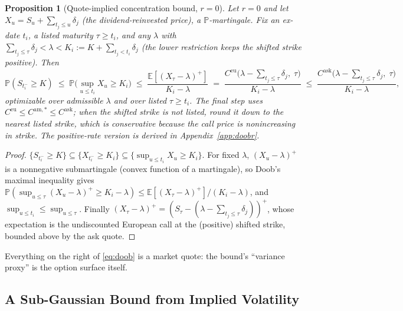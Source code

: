 \documentclass[11pt]{article}
\newtheorem{proposition}{Proposition}
\theoremstyle{remark}
\newcommand{\Ceu}{C^{\mathrm{eu}}}
\newcommand{\E}{\mathbb{E}}
\newcommand{\Prob}{\mathbb{P}}
\begin{document}
\begin{proposition}[Quote-implied concentration bound, $r=0$]\label{prop:doob}
Let $r=0$ and let $X_u=S_u+\sum_{t_j\le u}\delta_j$ (the dividend-reinvested price), a $\Prob$-martingale. Fix an ex-date $t_i$, a listed maturity $\tau\ge t_i$, and any $\lambda$ with $\sum_{t_j\le\tau}\delta_j<\lambda<K_i:=K+\sum_{t_j<t_i}\delta_j$ (the lower restriction keeps the shifted strike positive). Then
\begin{equation}
\Prob\!\left(S_{t_i^-}\ge K\right)\;\le\;\Prob\!\Big(\sup_{u\le t_i}X_u\ge K_i\Big)\;\le\;\frac{\E[(X_\tau-\lambda)^+]}{K_i-\lambda}\;=\;\frac{C^{\mathrm{eu}}\!\big(\lambda-{\textstyle\sum_{t_j\le\tau}}\delta_j,\;\tau\big)}{K_i-\lambda}\;\le\;\frac{C^{\mathrm{ask}}\!\big(\lambda-{\textstyle\sum_{t_j\le\tau}}\delta_j,\;\tau\big)}{K_i-\lambda},
\label{eq:doob}
\end{equation}
optimizable over admissible $\lambda$ and over listed $\tau\ge t_i$. The final step uses $\Ceu\le C^{\mathrm{am},*}\le C^{\mathrm{ask}}$; when the shifted strike is not listed, round it \emph{down} to the nearest listed strike, which is conservative because the call price is nonincreasing in strike. The positive-rate version is derived in Appendix~\ref{app:doobr}.
\end{proposition}

\begin{proof}
$\{S_{t_i^-}\ge K\}\subseteq\{X_{t_i^-}\ge K_i\}\subseteq\{\sup_{u\le t_i}X_u\ge K_i\}$. For fixed $\lambda$, $(X_u-\lambda)^+$ is a nonnegative submartingale (convex function of a martingale), so Doob's maximal inequality gives $\Prob(\sup_{u\le\tau}(X_u-\lambda)^+\ge K_i-\lambda)\le\E[(X_\tau-\lambda)^+]/(K_i-\lambda)$, and $\sup_{u\le t_i}\le\sup_{u\le\tau}$. Finally $(X_\tau-\lambda)^+=(S_\tau-(\lambda-\sum_{t_j\le\tau}\delta_j))^+$, whose expectation is the undiscounted European call at the (positive) shifted strike, bounded above by the ask quote.
\end{proof}

Everything on the right of \eqref{eq:doob} is a market quote: the bound's ``variance proxy'' is the option surface itself.

\subsection{A Sub-Gaussian Bound from Implied Volatility}
\end{document}
